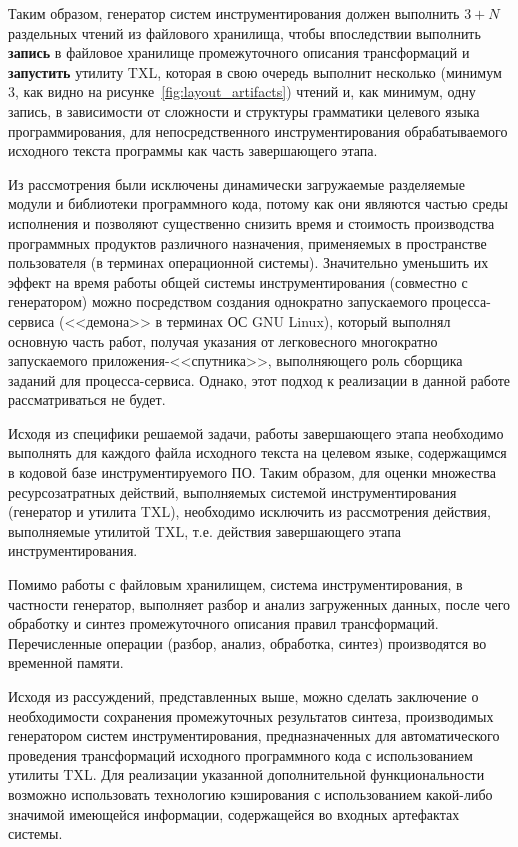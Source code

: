 Таким образом, генератор систем инструментирования должен выполнить $3 + N$ раздельных чтений из файлового хранилища, чтобы впоследствии выполнить \textbf{запись} в файловое хранилище промежуточного описания трансформаций и \textbf{запустить} утилиту TXL, которая в свою очередь выполнит несколько (минимум $3$, как видно на рисунке~\ref{fig:layout_artifacts}) чтений и, как минимум, одну запись, в зависимости от сложности и структуры грамматики целевого языка программирования, для непосредственного инструментирования обрабатываемого исходного текста программы как часть завершающего этапа.

Из рассмотрения были исключены динамически загружаемые разделяемые модули и библиотеки программного кода, потому как они являются частью среды исполнения и позволяют существенно снизить время и стоимость производства программных продуктов различного назначения, применяемых в пространстве пользователя (в терминах операционной системы).
Значительно уменьшить их эффект на время работы общей системы инструментирования (совместно с генератором) можно посредством создания однократно запускаемого процесса-сервиса (<<демона>> в терминах ОС GNU Linux), который выполнял основную часть работ, получая указания от легковесного многократно запускаемого приложения-<<спутника>>, выполняющего роль сборщика заданий для процесса-сервиса.
Однако, этот подход к реализации в данной работе рассматриваться не будет.


Исходя из специфики решаемой задачи, работы завершающего этапа необходимо выполнять для каждого файла исходного текста на целевом языке, содержащимся в кодовой базе инструментируемого ПО.
Таким образом, для оценки множества ресурсозатратных действий, выполняемых системой инструментирования (генератор и утилита TXL), необходимо исключить из рассмотрения действия, выполняемые утилитой TXL, т.е. действия завершающего этапа инструментирования.

Помимо работы с файловым хранилищем, система инструментирования, в частности генератор, выполняет разбор и анализ загруженных данных, после чего обработку и синтез промежуточного описания правил трансформаций.
Перечисленные операции (разбор, анализ, обработка, синтез) производятся во временной памяти.

Исходя из рассуждений, представленных выше, можно сделать заключение о необходимости сохранения промежуточных результатов синтеза, производимых генератором систем инструментирования, предназначенных для автоматического проведения трансформаций исходного программного кода с использованием утилиты TXL.
Для реализации указанной дополнительной функциональности возможно использовать технологию кэширования с использованием какой-либо значимой имеющейся информации, содержащейся во входных артефактах системы.

